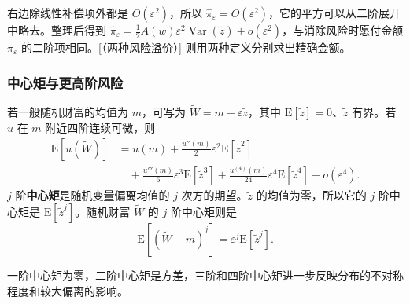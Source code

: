 右边除线性补偿项外都是 $O(\varepsilon^2)$，所以 $\hat\pi_\varepsilon=O(\varepsilon^2)$，它的平方可以从二阶展开中略去。整理后得到 $\hat\pi_\varepsilon=\tfrac12A(w)\varepsilon^2\operatorname{Var}(\tilde z)+o(\varepsilon^2)$，与消除风险时愿付金额 $\pi_\varepsilon$ 的二阶项相同。[（两种风险溢价）] 则用两种定义分别求出精确金额。

\subsubsection{中心矩与更高阶风险}
若一般随机财富的均值为 $m$，可写为 $\widetilde W=m+\varepsilon\tilde z$，其中 $\mathrm E[\tilde z]=0$、$\tilde z$ 有界。若 $u$ 在 $m$ 附近四阶连续可微，则
\[
\begin{aligned}
 \mathrm E[u(\widetilde W)]
 &=u(m)+\frac{u''(m)}2\varepsilon^2\mathrm E[\tilde z^2]\\
 &\quad+\frac{u'''(m)}6\varepsilon^3\mathrm E[\tilde z^3]
 +\frac{u^{(4)}(m)}{24}\varepsilon^4\mathrm E[\tilde z^4]+o(\varepsilon^4).
\end{aligned}
\]
$j$ 阶\textbf{中心矩}是随机变量偏离均值的 $j$ 次方的期望。$\tilde z$ 的均值为零，所以它的 $j$ 阶中心矩是 $\mathrm E[\tilde z^j]$。随机财富 $\widetilde W$ 的 $j$ 阶中心矩则是
\[
 \mathrm E[(\widetilde W-m)^j]=\varepsilon^j\mathrm E[\tilde z^j].
\]

一阶中心矩为零，二阶中心矩是方差，三阶和四阶中心矩进一步反映分布的不对称程度和较大偏离的影响。

